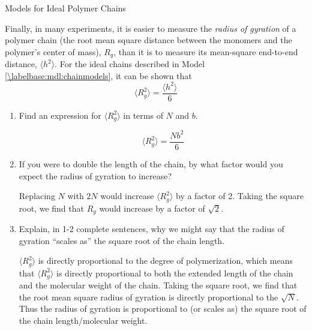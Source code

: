 \begin{activity}{Models for Ideal Polymer Chains}
\begin{ctqs}
		\begin{solution}[1.25in]\studentdisplay{}
		\end{solution}
	
	\question Finally, in many experiments, it is easier to measure the \emph{radius of gyration} of a polymer chain (the root mean square distance between the monomers and the polymer's center of mass), $R_g$, than it is to measure its mean-square end-to-end distance, $\langle h^2\rangle$.  For the ideal chains described in Model \ref{\labelbase:mdl:chainmodels}, it can be shown that
		\begin{equation*}
			\langle R_g^2\rangle = \frac{\langle h^2\rangle}{6}
		\end{equation*}
		
		\begin{enumerate}
			\item Find an expression for $\langle R_g^2 \rangle$ in terms of $N$ and $b$.
	
		\begin{solution}[0.75in]
			\begin{equation*}
				\langle R_g^2 \rangle = \frac{Nb^2}{6}
			\end{equation*}
		\end{solution}
			
			\item If you were to double the length of the chain, by what factor would you expect the radius of gyration to increase?
	
		\begin{solution}[0.75in]
			Replacing $N$ with $2N$ would increase $\langle R_g^2 \rangle$ by a factor of 2. Taking the square root, we find that $R_g$ would increase by a factor of $\sqrt{2}$.
		\end{solution}
			
			\item Explain, in 1-2 complete sentences, why we might say that the radius of gyration ``scales as'' the square root of the chain length.
	
		\begin{solution}[1.5in]
			$\langle R_g^2 \rangle$ is directly proportional to the degree of polymerization, which means that $\langle R_g^2 \rangle$ is directly proportional to both the extended length of the chain and the molecular weight of the chain.  Taking the square root, we find that the root mean square radius of gyration is directly proportional to the $\sqrt{N}$.  Thus the radius of gyration is proportional to (or scales as) the square root of the chain length/molecular weight.
		\end{solution}
		\end{enumerate}
	

\end{ctqs}
\end{activity}
